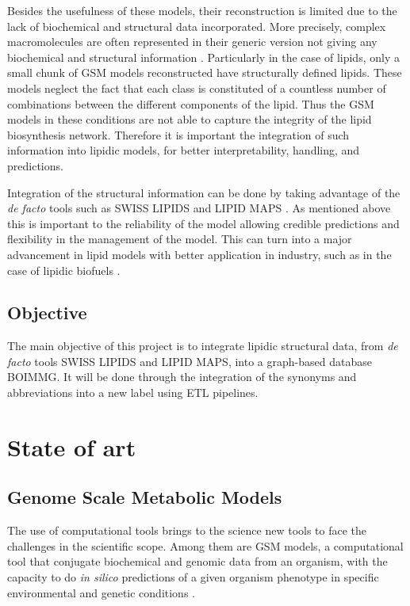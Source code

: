 \documentclass{llncs}
\begin{document}
Besides the usefulness of these models, their reconstruction is limited due to the lack of biochemical and structural data incorporated.
More precisely, complex macromolecules are often represented in their generic version not giving any biochemical and structural information \cite{Gu2019}.
Particularly in the case of lipids, only a small chunk of GSM models reconstructed have structurally defined lipids. 
These models neglect the fact that each class is constituted of a countless number of combinations between the different components of the lipid. 
Thus the GSM models in these conditions are not able to capture the integrity of the lipid biosynthesis network.
Therefore it is important the integration of such information into lipidic models, for better interpretability, handling, and predictions.

Integration of the structural information can be done by taking advantage of the  \emph{de facto} tools such as SWISS LIPIDS \cite{Aimo2015} and  LIPID MAPS \cite{Sud2007}.
As mentioned above this is important to the reliability of the model allowing credible predictions and flexibility in the management of the model.
This can turn into a major advancement in lipid models with better application in industry, such as in the case of lipidic biofuels \cite{Sawangkeaw2013}.




\subsection{Objective}

The main objective of this project is to integrate lipidic structural data, from \emph{de facto} tools SWISS LIPIDS and LIPID MAPS, into a graph-based database BOIMMG.
It will be done through the integration of the synonyms and abbreviations into a new label using ETL pipelines. 

\section{State of art}
\subsection{Genome Scale Metabolic Models}
The use of computational tools brings to the science new tools to face the challenges in the scientific scope.
Among them are GSM models, a computational tool that conjugate biochemical and genomic data from an organism, with the capacity to do \emph{in silico} predictions of a given organism phenotype in specific environmental and genetic conditions \cite{Rocha2007,Zhou2021}.
\end{document}
